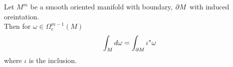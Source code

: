 \documentclass[../main.tex]{subfiles}
\begin{document}
\begin{thm}[Stokes]
	Let $M^{m}$ be a smooth oriented manifold with boundary, $\partial M$ with induced oreintation.\\
	Then for $\omega\in \Omega_c^{m-1}( M) $ 
	\[ 
	\int_{ M }^{  }d\omega  = \int_{\partial M} \iota^{\ast} \omega
	\]
	where $\iota$ is the inclusion.
\end{thm}
\end{document}
